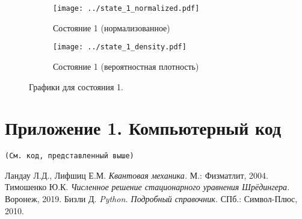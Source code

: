 \documentclass[a4paper, 12pt]{article}
\begin{document}
\begin{figure}[H]
    \centering
    \begin{subfigure}[b]{0.45\textwidth}
        \texttt{[image: ../state\_1\_normalized.pdf]}
        \caption{Состояние 1 (нормализованное)}
        \label{fig:state_1_normalized}
    \end{subfigure}
    \hfill
    \begin{subfigure}[b]{0.45\textwidth}
        \texttt{[image: ../state\_1\_density.pdf]}
        \caption{Состояние 1 (вероятностная плотность)}
        \label{fig:state_1_density}
    \end{subfigure}
    \caption{Графики для состояния 1.}
    \label{fig:state_1}
\end{figure}


\newpage
\appendix
\section*{Приложение 1. Компьютерный код}
\begin{verbatim}
(См. код, представленный выше)
\end{verbatim}

\newpage
\begin{thebibliography}{9}
 Ландау Л.Д., Лифшиц Е.М. \textit{Квантовая механика.} М.: Физматлит, 2004.
 Тимошенко Ю.К. \textit{Численное решение стационарного уравнения Шрёдингера.} Воронеж, 2019.
 Бизли Д. \textit{Python. Подробный справочник.} СПб.: Символ-Плюс, 2010.
\end{thebibliography}
\end{document}
